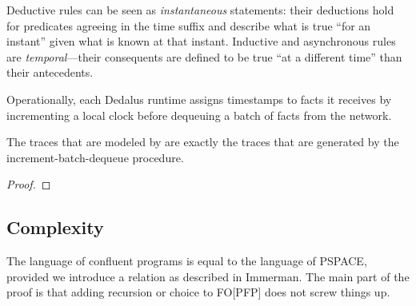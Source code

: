 Deductive rules can be seen as {\em instantaneous} statements: their deductions hold for 
predicates agreeing in the time suffix and describe what is true ``for an instant'' given 
what is known at that instant.
 Inductive and asynchronous 
 rules are {\em temporal}---their consequents are defined to
be true ``at a different time'' than their antecedents.

Operationally, each Dedalus runtime assigns timestamps to facts it receives by incrementing a local clock before dequeuing a batch of facts from the network.

\begin{lemma}
The traces that are modeled by \lang are exactly the traces that are generated by the increment-batch-dequeue procedure.
\end{lemma}
\begin{proof}
\end{proof}


\subsection{Complexity}

The language of confluent \lang programs is equal to the language of PSPACE, provided we introduce a  relation as described in Immerman.  The main part of the proof is that adding recursion or choice to FO[PFP] does not screw things up.  
